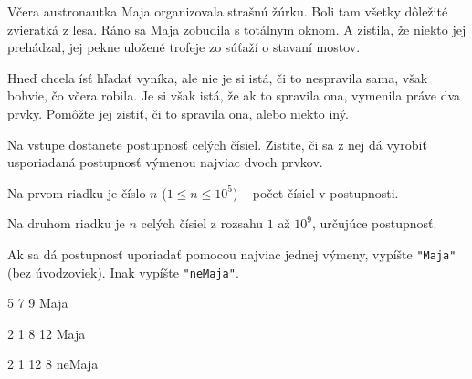 




Včera austronautka Maja organizovala strašnú žúrku. Boli tam všetky dôležité zvieratká z lesa. Ráno
sa Maja zobudila s totálnym oknom. A zistila, že niekto jej prehádzal, jej pekne uložené trofeje zo
súťaží o stavaní mostov.

Hneď chcela ísť hľadať vyníka, ale nie je si istá, či to nespravila sama, však bohvie, čo včera
robila. Je si však istá, že ak to spravila ona, vymenila práve dva prvky. Pomôžte jej zistiť, či to
spravila ona, alebo niekto iný.


Na vstupe dostanete postupnosť celých čísiel. Zistite, či sa z nej dá vyrobiť usporiadaná postupnosť
výmenou najviac dvoch prvkov.


Na prvom riadku je číslo $n$ ($1 \leq n \leq 10^5$) -- počet čísiel v postupnosti.

Na druhom riadku je $n$ celých čísiel z rozsahu $1$ až $10^9$, určujúce postupnosť.


Ak sa dá postupnosť uporiadať pomocou najviac jednej výmeny, vypíšte \texttt{"Maja"} (bez
úvodzoviek). Inak vypíšte \texttt{"neMaja"}.


5 7 9
\vystup
Maja
\koniec

2 1 8 12
\vystup
Maja
\koniec

2 1 12 8
\vystup
neMaja
\koniec


